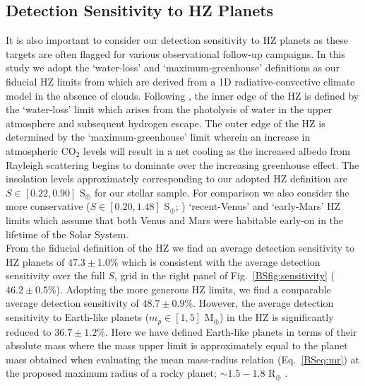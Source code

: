 \subsection{Detection Sensitivity to HZ Planets}
It is also important to consider our detection sensitivity to HZ planets as these targets are often
flagged for various observational follow-up campaigns. In this study we adopt the `water-loss' and
`maximum-greenhouse' definitions
as our fiducial HZ limits from \cite{kopparapu13} which are derived from a 1D radiative-convective
climate model in the absence of clouds. Following \cite{kasting93}, the inner edge of the HZ is defined
by the `water-loss' limit which arises from the photolysis of water in the upper atmosphere and subsequent
hydrogen escape. The outer edge of the HZ is determined by the `maximum-greenhouse' limit wherein an
increase in atmospheric CO$_2$ levels will result in a net cooling as the increased albedo from Rayleigh
scattering begins to dominate over the increasing greenhouse effect. The insolation levels 
approximately corresponding to our adopted HZ definition are $S \in [0.22,0.90]$ S$_{\oplus}$ for our
stellar sample. For comparison we
also consider the more conservative ($S \in [0.20,1.48]$ S$_{\oplus}$; \citealt{kopparapu13})
`recent-Venus' and `early-Mars' HZ limits which assume that both Venus and Mars were habitable early-on
in the lifetime of the Solar System. \\

From the fiducial definition of the HZ we find an average
detection sensitivity to HZ planets of $47.3 \pm 1.0$\% which is consistent with the average
detection sensitivity over the full $S$,\msini{} grid in the right panel
of Fig.~\ref{BSfig:sensitivity}
($46.2 \pm 0.5$\%). Adopting the more generous HZ limits, we find a comparable average
detection sensitivity of $48.7 \pm 0.9$\%.
However, the average detection sensitivity to Earth-like planets ($m_p \in [1,5]$ M$_{\oplus}$) in the HZ
is significantly reduced to $36.7 \pm 1.2$\%. Here we have defined Earth-like planets in terms of their
absolute mass where the mass upper limit is approximately equal to 
the planet mass obtained when evaluating the mean mass-radius relation (Eq.~\ref{BSeq:mr}) at the
proposed maximum radius of a rocky planet; $\sim 1.5-1.8$ R$_{\oplus}$ \citep{weiss14, rogers15, fulton17}.

